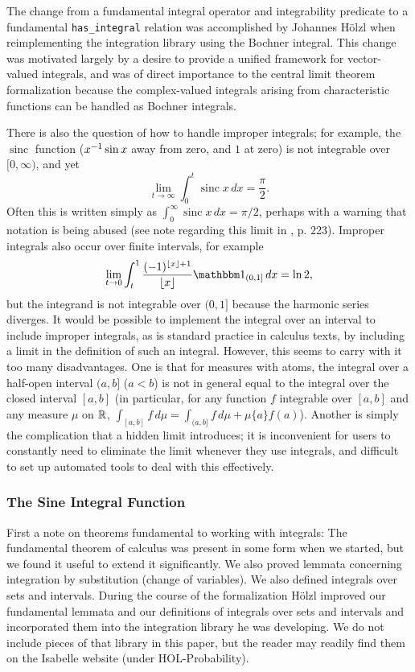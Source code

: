 \documentclass{article}
\theoremstyle{definition}
\newcommand\sinc{\mathop{\text{sinc}}\nolimits}
\newcommand\floor[1]{\lfloor {#1} \rfloor}
\begin{document}
The change from a fundamental integral operator and integrability predicate to a fundamental \texttt{has\_integral} relation was accomplished by Johannes H\"olzl when reimplementing the integration library using the Bochner integral. This change was motivated largely by a desire to provide a unified framework for vector-valued integrals, and was of direct importance to the central limit theorem formalization because the complex-valued integrals arising from characteristic functions can be handled as Bochner integrals.

There is also the question of how to handle improper integrals; for example, the $\sinc$ function ($x^{-1} \sin x$ away from zero, and $1$ at zero) is not integrable over $[0,\infty)$, and yet 
\[ \lim_{t \rightarrow \infty} \int_0^t \sinc x \, dx = \frac{\pi}{2}. \]
Often this is written simply as $\int_0^\infty \sinc x \, dx = \pi/2$, perhaps with a warning that notation is being abused (see note regarding this limit in \cite{billingsley}, p. 223). Improper integrals also occur over finite intervals, for example
\[ \lim_{t \rightarrow 0} \int_t^1 \frac{(-1)^{\floor x + 1}}{\floor x} \mathbbm 1_{(0,1]} \, dx = \ln 2, \]
but the integrand is not integrable over $(0,1]$ because the harmonic series diverges. It would be possible to implement the integral over an interval to include improper integrals, as is standard practice in calculus texts, by including a limit in the definition of such an integral. However, this seems to carry with it too many disadvantages. One is that for measures with atoms, the integral over a half-open interval $(a,b]$ ($a < b$) is not in general equal to the integral over the closed interval $[a,b]$ (in particular, for any function $f$ integrable over $[a,b]$ and any measure $\mu$ on $\mathbb{R}$, $\int_{[a,b]} f \, d\mu = \int_{(a,b]} f \, d\mu + \mu \{a\} f(a)$). Another is simply the complication that a hidden limit introduces; it is inconvenient for users to constantly need to eliminate the limit whenever they use integrals, and difficult to set up automated tools to deal with this effectively.

\subsubsection{The Sine Integral Function} \label{sec:Si}

First a note on theorems fundamental to working with integrals: The fundamental theorem of calculus was present in some form when we started, but we found it useful to extend it significantly. We also proved lemmata concerning integration by substitution (change of variables). We also defined integrals over sets and intervals. During the course of the formalization H\"olzl improved our fundamental lemmata and our definitions of integrals over sets and intervals and incorporated them into the integration library he was developing. We do not include pieces of that library in this paper, but the reader may readily find them on the Isabelle website (under HOL-Probability).
\end{document}
